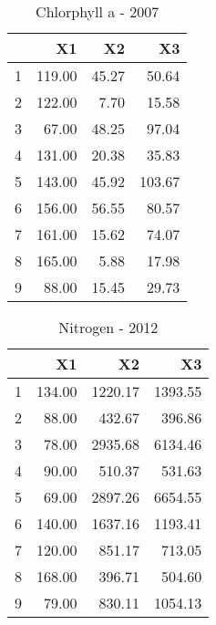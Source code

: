 \documentclass{article}\usepackage{graphicx, color}
\begin{document}
\begin{table}[ht]
\centering
\begin{tabular}{rrrr}
  \hline
 & X1 & X2 & X3 \\ 
  \hline
1 & 119.00 & 45.27 & 50.64 \\ 
  2 & 122.00 & 7.70 & 15.58 \\ 
  3 & 67.00 & 48.25 & 97.04 \\ 
  4 & 131.00 & 20.38 & 35.83 \\ 
  5 & 143.00 & 45.92 & 103.67 \\ 
  6 & 156.00 & 56.55 & 80.57 \\ 
  7 & 161.00 & 15.62 & 74.07 \\ 
  8 & 165.00 & 5.88 & 17.98 \\ 
  9 & 88.00 & 15.45 & 29.73 \\ 
   \hline
\end{tabular}
\caption{Chlorphyll a - 2007} 
\end{table}

\begin{table}[ht]
\centering
\begin{tabular}{rrrr}
  \hline
 & X1 & X2 & X3 \\ 
  \hline
1 & 134.00 & 1220.17 & 1393.55 \\ 
  2 & 88.00 & 432.67 & 396.86 \\ 
  3 & 78.00 & 2935.68 & 6134.46 \\ 
  4 & 90.00 & 510.37 & 531.63 \\ 
  5 & 69.00 & 2897.26 & 6654.55 \\ 
  6 & 140.00 & 1637.16 & 1193.41 \\ 
  7 & 120.00 & 851.17 & 713.05 \\ 
  8 & 168.00 & 396.71 & 504.60 \\ 
  9 & 79.00 & 830.11 & 1054.13 \\ 
   \hline
\end{tabular}
\caption{Nitrogen - 2012} 
\end{table}
\end{document}
